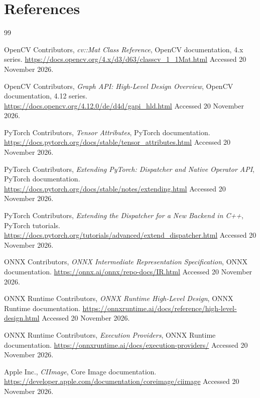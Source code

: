 \documentclass[11pt,a4paper,oneside]{article}
\begin{document}
\section{References}
\begin{thebibliography}{99}

OpenCV Contributors,
\emph{cv::Mat Class Reference}, OpenCV documentation, 4.x series.
\newblock \url{https://docs.opencv.org/4.x/d3/d63/classcv_1_1Mat.html}
\newblock Accessed 20 November 2026.

OpenCV Contributors,
\emph{Graph API: High-Level Design Overview}, OpenCV documentation, 4.12 series.
\newblock \url{https://docs.opencv.org/4.12.0/de/d4d/gapi_hld.html}
\newblock Accessed 20 November 2026.

PyTorch Contributors,
\emph{Tensor Attributes}, PyTorch documentation.
\newblock \url{https://docs.pytorch.org/docs/stable/tensor_attributes.html}
\newblock Accessed 20 November 2026.

PyTorch Contributors,
\emph{Extending PyTorch: Dispatcher and Native Operator API}, PyTorch documentation.
\newblock \url{https://docs.pytorch.org/docs/stable/notes/extending.html}
\newblock Accessed 20 November 2026.

PyTorch Contributors,
\emph{Extending the Dispatcher for a New Backend in C++}, PyTorch tutorials.
\newblock \url{https://docs.pytorch.org/tutorials/advanced/extend_dispatcher.html}
\newblock Accessed 20 November 2026.

ONNX Contributors,
\emph{ONNX Intermediate Representation Specification}, ONNX documentation.
\newblock \url{https://onnx.ai/onnx/repo-docs/IR.html}
\newblock Accessed 20 November 2026.

ONNX Runtime Contributors,
\emph{ONNX Runtime High-Level Design}, ONNX Runtime documentation.
\newblock \url{https://onnxruntime.ai/docs/reference/high-level-design.html}
\newblock Accessed 20 November 2026.

ONNX Runtime Contributors,
\emph{Execution Providers}, ONNX Runtime documentation.
\newblock \url{https://onnxruntime.ai/docs/execution-providers/}
\newblock Accessed 20 November 2026.

Apple Inc.,
\emph{CIImage}, Core Image documentation.
\newblock \url{https://developer.apple.com/documentation/coreimage/ciimage}
\newblock Accessed 20 November 2026.


\end{thebibliography}
\end{document}
